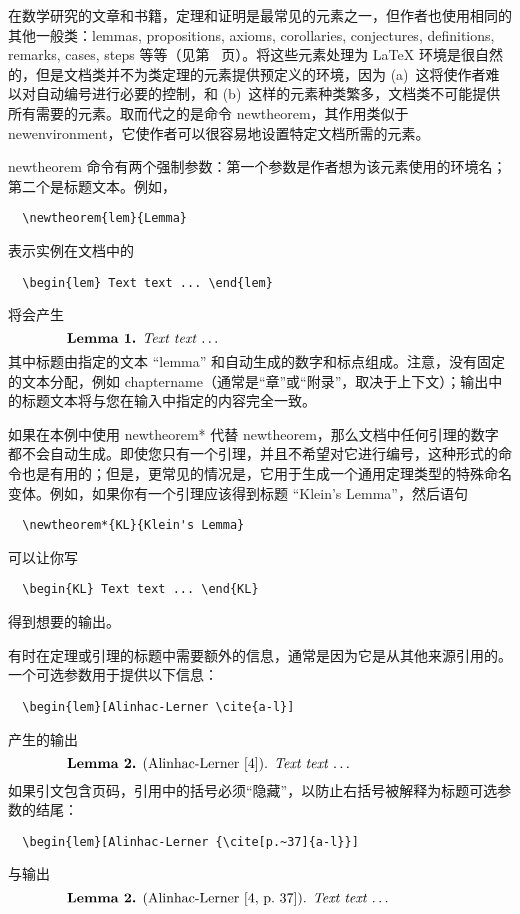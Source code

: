 \documentclass[11pt,twoside]{article}
\providecommand{\qq}[1]{“#1”}
\newcommand{\ntt}{%
  \fontfamily\ttdefault \fontseries\mddefault \fontshape\updefault
  \selectfont
}
\DeclareRobustCommand{\cn}[1]{{\ntt\bslchar#1}}
\def\latex/{{\protect\LaTeX}}
\begin{document}
在数学研究的文章和书籍，定理和证明是最常见的元素之一，但作者也使用相同的其他一般类：lemmas, propositions, axioms, corollaries, conjectures, definitions, remarks, cases, steps 等等（见第~\pageref{thmstyle:list} 页）。将这些元素处理为 \latex/ 环境是很自然的，但是文档类并不为类定理的元素提供预定义的环境，因为 (a)~这将使作者难以对自动编号进行必要的控制，和 (b)~这样的元素种类繁多，文档类不可能提供所有需要的元素。取而代之的是命令 \cn{newtheorem}，其作用类似于 \cn{newenvironment}，它使作者可以很容易地设置特定文档所需的元素。

\cn{newtheorem} 命令有两个强制参数：第一个参数是作者想为该元素使用的环境名；第二个是标题文本。例如，
\begin{verbatim}
  \newtheorem{lem}{Lemma}
\end{verbatim}
表示实例在文档中的
\begin{verbatim}
  \begin{lem} Text text ... \end{lem}
\end{verbatim}
将会产生
\[\makebox[.8\columnwidth]{%
  \textbf{Lemma 1.} \textit{Text text \dots}\hfill}\]
其中标题由指定的文本 \qq{lemma} 和自动生成的数字和标点组成。注意，没有固定的文本分配，例如 \cn{chaptername}（通常是“章”或“附录”，取决于上下文）；输出中的标题文本将与您在输入中指定的内容完全一致。

如果在本例中使用 \cn{newtheorem*} 代替 \cn{newtheorem}，那么文档中任何引理的数字都不会自动生成。即使您只有一个引理，并且不希望对它进行编号，这种形式的命令也是有用的；但是，更常见的情况是，它用于生成一个通用定理类型的特殊命名变体。例如，如果你有一个引理应该得到标题 \qq{Klein's Lemma}，然后语句
\begin{verbatim}
  \newtheorem*{KL}{Klein's Lemma}
\end{verbatim}
可以让你写
\begin{verbatim}
  \begin{KL} Text text ... \end{KL}
\end{verbatim}
得到想要的输出。

有时在定理或引理的标题中需要额外的信息，通常是因为它是从其他来源引用的。一个可选参数用于提供以下信息：
\begin{verbatim}
  \begin{lem}[Alinhac-Lerner \cite{a-l}]
\end{verbatim}
产生的输出
\[\makebox[.8\columnwidth]{%
  \textbf{Lemma 2.} (Alinhac-Lerner [4]). \textit{Text text \dots}\hfill}\]
如果引文包含页码，引用中的括号必须“隐藏”，以防止右括号被解释为标题可选参数的结尾：
\begin{verbatim}
  \begin{lem}[Alinhac-Lerner {\cite[p.~37]{a-l}}]
\end{verbatim}
与输出
\[\makebox[.8\columnwidth]{%
  \textbf{Lemma 2.} (Alinhac-Lerner [4, p.~37]). \textit{Text text \dots}\hfill}\]
\end{document}
